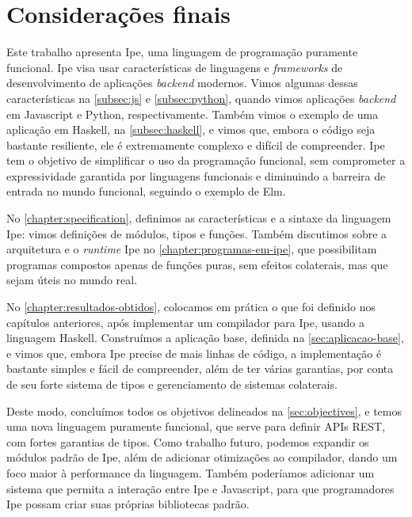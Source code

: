 
\chapter{Considerações finais}

Este trabalho apresenta Ipe, uma linguagem de programação puramente funcional.
Ipe visa usar características de linguagens e \textit{frameworks} de desenvolvimento
de aplicações \textit{backend} modernos. Vimos algumas dessas características na
\autoref{subsec:js} e \autoref{subsec:python}, quando vimos aplicações \textit{backend}
em Javascript e Python, respectivamente. Também vimos o exemplo de uma aplicação
em Haskell, na \autoref{subsec:haskell}, e vimos que, embora o código seja bastante
resiliente, ele é extremamente complexo e difícil de compreender. Ipe tem o objetivo
de simplificar o uso da programação funcional, sem comprometer a expressividade
garantida por linguagens funcionais e diminuindo a barreira de entrada no mundo
funcional, seguindo o exemplo de Elm.

No \autoref{chapter:specification}, definimos as características e a sintaxe da
linguagem Ipe: vimos definições de módulos, tipos e funções. Também discutimos
sobre a arquitetura e o \textit{runtime} Ipe no \autoref{chapter:programas-em-ipe},
que possibilitam programas compostos apenas de funções puras, sem efeitos colaterais,
mas que sejam úteis no mundo real.

No \autoref{chapter:resultados-obtidos}, colocamos em prática o que foi definido
nos capítulos anteriores, após implementar um compilador para Ipe, usando a linguagem Haskell.
Construímos a aplicação base, definida na \autoref{sec:aplicacao-base}, e vimos que, embora Ipe precise
de mais linhas de código, a implementação é bastante simples e fácil de compreender, além de ter
várias garantias, por conta de seu forte sistema de tipos e gerenciamento de sistemas colaterais.

Deste modo, concluímos todos os objetivos delineados na \autoref{sec:objectives}, e temos uma nova
linguagem puramente funcional, que serve para definir APIs REST, com fortes garantias de tipos.
Como trabalho futuro, podemos expandir os módulos padrão de Ipe, além de adicionar otimizações ao
compilador, dando um foco maior à performance da linguagem. Também poderíamos adicionar um sistema
que permita a interação entre Ipe e Javascript, para que programadores Ipe possam criar suas próprias
bibliotecas padrão.

